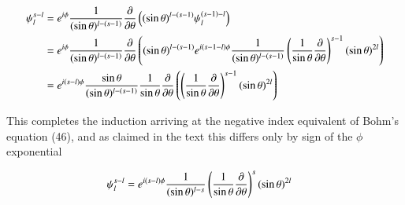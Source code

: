 \begin{align*}
\psi_l^{s-l} 
&=
e^{i\phi} \frac{1}{(\sin\theta)^{l-(s-1)}} \frac{\partial {}}{\partial {\theta}} \left( (\sin\theta)^{l-(s-1)} \psi_l^{(s-1)-l} \right) \\
&=
e^{i\phi} \frac{1}{(\sin\theta)^{l-(s-1)}} \frac{\partial {}}{\partial {\theta}} \left( (\sin\theta)^{l-(s-1)} 
e^{i(s-1-l)\phi} \frac{1}{(\sin\theta)^{l-(s-1)}} \left( \frac{1}{\sin\theta}\frac{\partial {}}{\partial {\theta}} \right)^{s-1} (\sin\theta)^{2l} 
\right) \\
&=
e^{i(s-l)\phi}
\frac{\sin\theta}{(\sin\theta)^{l-(s-1)}} \frac{1}{\sin\theta} \frac{\partial {}}{\partial {\theta}} \left( 
\left( \frac{1}{\sin\theta}\frac{\partial {}}{\partial {\theta}} \right)^{s-1} (\sin\theta)^{2l} 
\right) \\
\end{align*}

This completes the induction arriving at the negative index equivalent of Bohm's equation (46), and as claimed in the text this differs only by sign of the $\phi$ exponential

\begin{align}\label{eqn:sminusL}
\psi_l^{s-l} 
&=
e^{i(s-l)\phi} \frac{1}{(\sin\theta)^{l-s}} \left( \frac{1}{\sin\theta}\frac{\partial {}}{\partial {\theta}} \right)^s (\sin\theta)^{2l} 
\end{align}

\EndArticle
